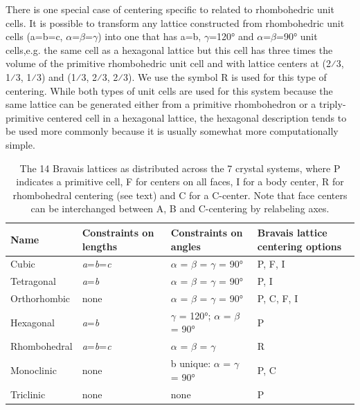  There is one special case of centering specific to related to rhombohedric unit cells. It is possible to transform any lattice constructed from rhombohedric unit cells (a=b=c, $\alpha$=$\beta$=$\gamma$) into one that has a=b, $\gamma$=120° and $\alpha$=$\beta$=90° unit cells,e.g. the same cell as a hexagonal lattice but this cell has three times the volume of the primitive rhombohedric unit cell and with lattice centers at (2⁄3, 1⁄3, 1⁄3) and (1⁄3, 2⁄3, 2⁄3). We use the symbol R is used for this type of centering. While both types of unit cells are used for this system because the same lattice can be generated either from a primitive rhombohedron or a triply-primitive centered cell in a hexagonal lattice, the hexagonal description tends to be used more commonly because it is usually somewhat more computationally simple.

\begin{table}
\centering
\caption{The 14 Bravais lattices as distributed across the 7 crystal systems, where P indicates a primitive cell, F for centers on all faces, I for a body center, R for rhombohedral centering (see text) and C for a C-center. Note that face centers can be interchanged between A, B and C-centering by relabeling axes.}
\begin{tabular}{| l | p{} | p{} | p{} |}
\hline
Name & Constraints on lengths & Constraints on angles & Bravais lattice centering options \\
\hline
Cubic & \textit{a}=\textit{b}=\textit{c} & $\alpha$ = $\beta$ = $\gamma$ = 90° & P, F, I \\
\hline
Tetragonal & \textit{a}=\textit{b} & $\alpha$ = $\beta$ = $\gamma$ = 90° & P, I \\
\hline
Orthorhombic & none & $\alpha$ = $\beta$ = $\gamma$ = 90° & P, C, F, I \\
\hline
Hexagonal & \textit{a}=\textit{b} & $\gamma$ = 120°; $\alpha$ = $\beta$ = 90° & P \\
\hline
Rhombohedral & \textit{a}=\textit{b}=\textit{c} & $\alpha$ = $\beta$ = $\gamma$ & R \\
\hline
Monoclinic & none & b unique: $\alpha$ = $\gamma$ = 90° & P, C \\
\hline
Triclinic & none & none & P \\
\hline

\end{tabular}

\end{table}


